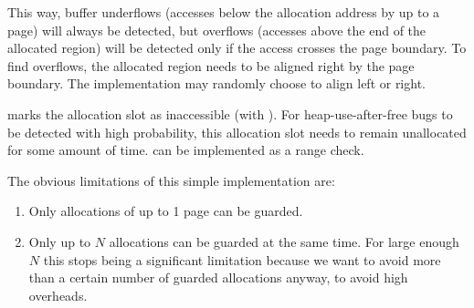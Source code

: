 This way, buffer underflows (accesses below the allocation address by up to a
page) will always be detected, but overflows (accesses above the end of the
allocated region) will be detected only if the access crosses the page
boundary. To find overflows, the allocated region needs to be aligned right by
the page boundary. The implementation may randomly choose to align left or
right.

  marks
the allocation slot as inaccessible (with ). For
heap-use-after-free bugs to be detected with high probability, this
allocation slot needs to remain unallocated for some amount of time.
 can be implemented as a range check.

 The obvious limitations of this simple implementation
are:
\begin{enumerate}

  \item Only allocations of up to 1 page can be guarded.

  \item Only up to $N$ allocations can be guarded at the same time. For large
    enough $N$ this stops being a significant limitation because we want to
    avoid more than a certain number of guarded allocations anyway, to avoid
    high overheads.

\end{enumerate}

